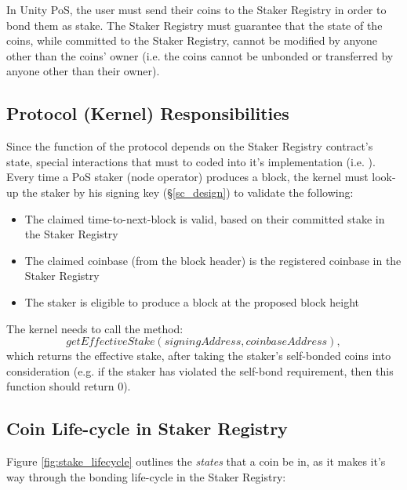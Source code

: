In Unity PoS, the user must send their coins to the Staker Registry in order to bond them as stake. The Staker Registry must guarantee that the state of the coins, while committed to the Staker Registry, cannot be modified by anyone other than the coins' owner (i.e. the coins cannot be unbonded or transferred by anyone other than their owner).  

\subsection{Protocol (Kernel) Responsibilities}
Since the function of the protocol depends on the Staker Registry contract's state, special interactions that must to coded into it's implementation (i.e. ). Every time a PoS staker (node operator) produces a block, the kernel must look-up the staker by his signing key (\S\ref{sc_design}) to validate the following:
\begin{itemize}[label=--,nosep]
    \item The claimed time-to-next-block is valid, based on their committed stake in the Staker Registry
    \item The claimed coinbase (from the block header) is the registered coinbase in the Staker Registry
    \item The staker is eligible to produce a block at the proposed block height 
\end{itemize}

The kernel needs to call the method: $$getE\!f\!fectiveStake(signingAddress, coinbaseAddress),$$ which returns the effective stake, after taking the staker's self-bonded coins into consideration (e.g. if the staker has violated the self-bond requirement, then this function should return 0).

\subsection{Coin Life-cycle in Staker Registry} \label{staker_registry_lifecycle}

Figure \ref{fig:stake_lifecycle} outlines the \textit{states} that a coin be in, as it makes it's way through the bonding life-cycle in the Staker Registry:

